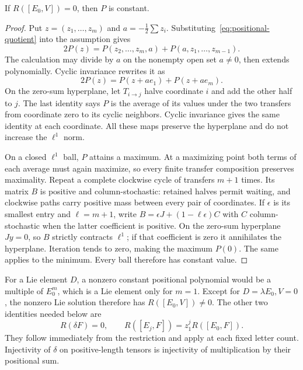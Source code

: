 \begin{lemma}\label{lem:diagonal}
If $R([E_0,V])=0$, then $P$ is constant.
\end{lemma}
\begin{proof}
Put $z=(z_1,\ldots,z_m)$ and $a=-\frac12\sum z_i$.
Substituting~\eqref{eq:positional-quotient} into the assumption gives
\[
 2P(z)=P(z_2,\ldots,z_m,a)+P(a,z_1,\ldots,z_{m-1}).
\]
The calculation may divide by $a$ on the nonempty open set $a\ne0$,
then extends polynomially. Cyclic invariance rewrites it as
\[
 2P(z)=P(z+ae_1)+P(z+ae_m).
\]
On the zero-sum hyperplane, let $T_{i\to j}$ halve coordinate $i$
and add the other half to $j$. The last identity says $P$ is the
average of its values under the two transfers from coordinate zero
to its cyclic neighbors. Cyclic invariance gives the same identity
at each coordinate. All these maps preserve the hyperplane and do
not increase the $\ell^1$ norm.

On a closed $\ell^1$ ball, $P$ attains a maximum. At a maximizing
point both terms of each average must again maximize, so every finite
transfer composition preserves maximality. Repeat a complete clockwise
cycle of transfers $m+1$ times. Its matrix $B$ is positive and
column-stochastic: retained halves permit waiting, and clockwise paths
carry positive mass between every pair of coordinates. If $\epsilon$
is its smallest entry and $\ell=m+1$, write
$B=\epsilon J+(1-\ell\epsilon)C$ with $C$ column-stochastic when
the latter coefficient is positive. On the zero-sum hyperplane
$Jy=0$, so $B$ strictly contracts $\ell^1$; if that coefficient is
zero it annihilates the hyperplane. Iteration tends to zero, making
the maximum $P(0)$. The same applies to the minimum. Every ball
therefore has constant value.
\end{proof}

For a Lie element $D$, a nonzero constant positional polynomial would
be a multiple of $E_0^m$, which is a Lie element only for $m=1$.
Except for $D=\lambda E_0,V=0$, the nonzero Lie solution therefore
has $R([E_0,V])\ne0$. The other two identities needed below are
\begin{equation}\label{eq:r-kills}
 R(\delta F)=0,\qquad R([E_j,F])=z_1^jR([E_0,F]).
\end{equation}
They follow immediately from the restriction and apply at each fixed
letter count. Injectivity of $\delta$ on positive-length tensors is
injectivity of multiplication by their positional sum.

